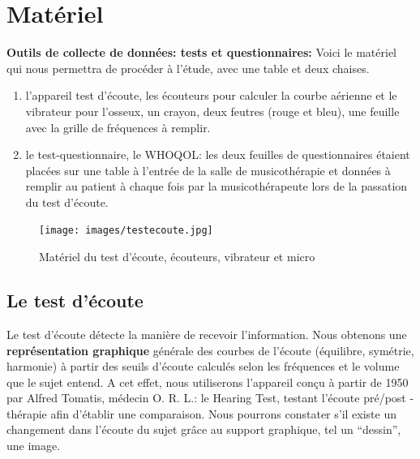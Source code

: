 \section{Matériel}
\textbf{Outils de collecte de données: tests et questionnaires: }
Voici le matériel qui nous permettra de procéder à l'étude, avec une table et deux chaises.
\begin{enumerate}
	\item l'appareil
	test d'écoute, les écouteurs pour calculer la courbe  aérienne et le vibrateur pour l'osseux, un crayon, 
	deux
	feutres (rouge et bleu), une feuille avec la grille de fréquences à
	remplir.

	\item le test-questionnaire, le WHOQOL: 
les deux feuilles de questionnaires étaient placées sur une table à l'entrée de la salle de musicothérapie 
et données à remplir au patient à chaque fois par la musicothérapeute lors de la passation du test 
d'écoute. 
\end{enumerate}
\begin{figure}
	\centering
	\texttt{[image: images/testecoute.jpg]}
	\caption[Appareil test écoute]{Matériel du test d'écoute, écouteurs, vibrateur et micro}
	
	\label{appareiltestecoute}
\end{figure}

\subsection *{Le test d'écoute}
Le test d'écoute détecte la manière de recevoir
l'information.
Nous obtenons une
\textbf{représentation graphique} générale des courbes de l'écoute
(équilibre, symétrie, harmonie) à partir des seuils d'écoute
calculés selon les fréquences et le volume que le sujet entend.
A cet effet, nous utiliserons l'appareil conçu à partir de 1950 par Alfred Tomatis, médecin
O. R. L.: le Hearing Test, testant
l'écoute pré/post - thérapie
afin d'établir une comparaison.
Nous pourrons constater
s'il existe un changement dans l'écoute du sujet grâce au support graphique, tel un ``dessin'',
une image. %

